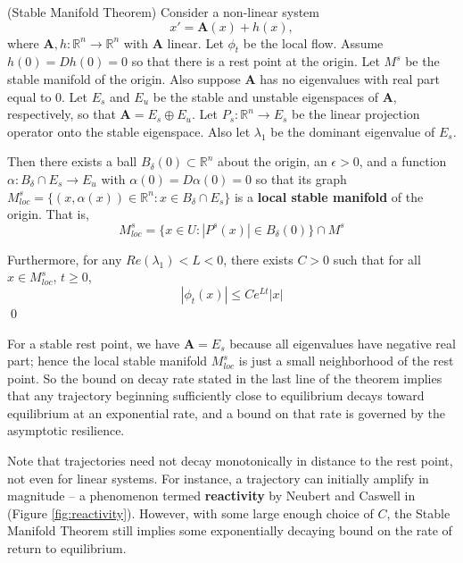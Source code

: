 \begin{theorem}(Stable Manifold Theorem)
	Consider a non-linear system 
	$$x' = \mathbf{A}(x) + h(x),$$ 
	where $\mathbf{A}, h: \mathbb{R}^n \to \mathbb{R}^n$ with $\mathbf{A}$ linear.  Let $\phi_t$ be the local flow.
	Assume $h(0) =  Dh(0)=0$ so that there is a rest point at the origin. Let $M^s$ be the stable manifold of the origin. 
	Also suppose $\mathbf{A}$ has no eigenvalues with real part equal to 0. Let $E_s$ and $E_u$ be the stable and unstable eigenspaces of $\mathbf{A}$, respectively, so that $\textbf{A} = E_s \oplus E_u$. Let $P_s: \mathbb{R}^n \to E_s$ %
	be the linear projection operator onto the stable %
	eigenspace. Also let $\lambda_1$ be the dominant eigenvalue of $E_s$. 
	
	Then there exists a ball $B_\delta(0) \subset \mathbb{R}^n$ about the origin, 
	an $\epsilon > 0$, 
	and a function $\alpha: B_\delta \cap E_s \to E_u $ with $\alpha(0)  = D\alpha(0) = 0$ 
	so that its graph $M^s_{loc} = \{(x, \alpha(x)) \in \mathbb{R}^n : x \in B_\delta \cap E_s\}$ is a \textbf{local stable manifold} of the origin. 
	That is, $$M^s_{loc} = \{x \in U : |P^s(x)| \in B_\delta(0)\} \cap M^s$$
	
	Furthermore, for any $Re(\lambda_1) < L < 0$, there exists $C >0$ such that for all $x \in M^s_{loc}$, $t \geq 0$,
	$$|\phi_t(x)| \leq Ce^{Lt}|x|$$ \qed
\end{theorem}

For a stable rest point, we have $\mathbf{A} = E_s$ because all eigenvalues have negative real part; hence the local stable manifold $M^s_{loc}$ is just a small neighborhood of the rest point. So the bound on decay rate stated in the last line of the theorem implies that any trajectory beginning sufficiently close to equilibrium decays toward equilibrium at an exponential rate, and a bound on that rate is governed by the asymptotic resilience.


\begin{remark}
	Note that trajectories need not decay monotonically in distance to the rest point, not even for linear systems. For instance, a trajectory can initially amplify in magnitude -- a phenomenon termed \textbf{reactivity} by Neubert and Caswell in \cite{neubertAlternativesResilienceMeasuring1997a} (Figure \ref{fig:reactivity}). However, with some large enough choice of $C$, the Stable Manifold Theorem still implies some exponentially decaying bound on the rate of return to equilibrium. 
\end{remark}

